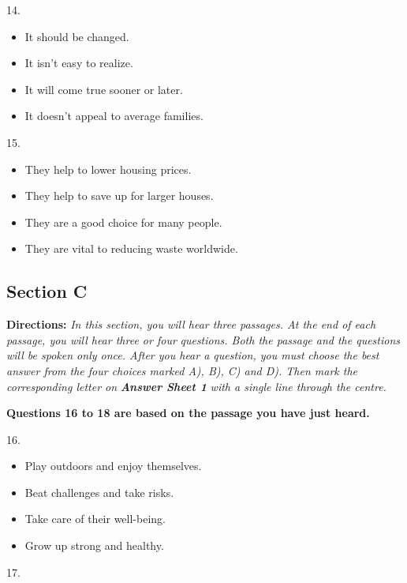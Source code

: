 \documentclass[UTF8,11pt]{ctexart}
\begin{document}
14.


\begin{itemize}[leftmargin=2em,itemsep=.2em,topsep=.4em]\item[A.] It should be changed.
\item[B.] It isn’t easy to realize.
\item[C.] It will come true sooner or later.
\item[D.] It doesn’t appeal to average families.
\end{itemize}

15.


\begin{itemize}[leftmargin=2em,itemsep=.2em,topsep=.4em]\item[A.] They help to lower housing prices.
\item[B.] They help to save up for larger houses.
\item[C.] They are a good choice for many people.
\item[D.] They are vital to reducing waste worldwide.
\end{itemize}

\subsection*{\textbf{Section C}}


\textbf{Directions:}\textit{ In this section, you will hear three passages. At the end of each passage, you will hear three or four} \textit{questions. Both the passage and the questions will be spoken only once. After you hear a question, you must} \textit{choose the best answer from the four choices marked A), B), C) and D). Then mark the corresponding letter on} \textbf{\textit{Answer Sheet 1}}\textit{ with a single line through the centre.}


\textbf{Questions 16 to 18 are based on the passage you have just heard.}


16.


\begin{itemize}[leftmargin=2em,itemsep=.2em,topsep=.4em]\item[A.] Play outdoors and enjoy themselves.
\item[B.] Beat challenges and take risks.
\item[C.] Take care of their well-being.
\item[D.] Grow up strong and healthy.
\end{itemize}

17.
\end{document}
